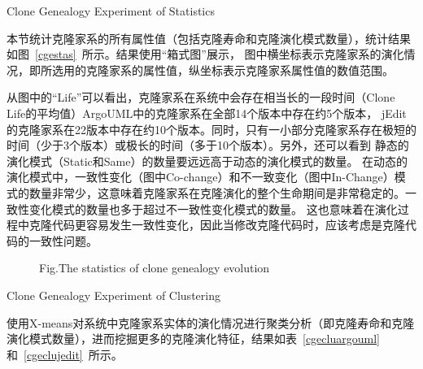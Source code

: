 {Clone Genealogy Experiment of Statistics} 

本节统计克隆家系的所有属性值（包括克隆寿命和克隆演化模式数量），统计结果如图~\ref{cgestas}~所示。结果使用“箱式图”展示， 图中横坐标表示克隆家系的演化情况，即所选用的克隆家系的属性值，纵坐标表示克隆家系属性值的数值范围。
 
从图中的“Life”可以看出，克隆家系在系统中会存在相当长的一段时间（Clone Life的平均值）ArgoUML中的克隆家系在全部14个版本中存在约5个版本， jEdit的克隆家系在22版本中存在约10个版本。同时，只有一小部分克隆家系存在极短的时间（少于3个版本）或极长的时间（多于10个版本）。另外，还可以看到 静态的演化模式（Static和Same）的数量要远远高于动态的演化模式的数量。 在动态的演化模式中，一致性变化（图中Co-change）和不一致变化（图中In-Change）模式的数量非常少，这意味着克隆家系在克隆演化的整个生命期间是非常稳定的。一致性变化模式的数量也多于超过不一致性变化模式的数量。 这也意味着在演化过程中克隆代码更容易发生一致性变化，因此当修改克隆代码时，应该考虑是克隆代码的一致性问题。

\begin{figure}[htbp]
\centering
\subfigure{\label{cgestargo}}
\addtocounter{subfigure}{-2}
\subfigure{\label{cgestjedit}}
\addtocounter{subfigure}{-2}
{Fig.$\!$}{The statistics of clone genealogy evolution}
\vspace{-1em}
\end{figure}
 
{Clone Genealogy Experiment of Clustering} 

使用X-means对系统中克隆家系实体的演化情况进行聚类分析（即克隆寿命和克隆演化模式数量），进而挖掘更多的克隆演化特征，结果如表~\ref{cgecluargouml}和~\ref{cgeclujedit}~所示。

